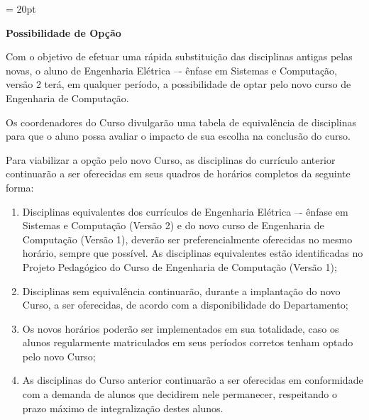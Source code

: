 \documentclass[12pt,a4paper]{article}
\begin{document}
\thispagestyle{firstpage} %
\headsep = 20pt
\setlength{\tabcolsep}{5pt} %
\vspace*{2.0cm}

\pagestyle{plain} %

\begin{center}
  \textbf{\LARGE Possibilidade de Opção}
\end{center}
\vspace*{0.5cm}

Com o objetivo de efetuar uma rápida substituição das disciplinas antigas pelas novas, o
aluno de Engenharia Elétrica –- ênfase em Sistemas e Computação, versão 2  terá, em qualquer período, a possibilidade de
optar pelo novo curso de Engenharia de Computação.

Os coordenadores do Curso divulgarão uma tabela de equivalência de disciplinas para que
o aluno possa avaliar o impacto de sua escolha na conclusão do curso.

Para viabilizar a opção pelo novo Curso, as disciplinas do currículo anterior continuarão a
ser oferecidas em seus quadros de horários completos da seguinte forma:

\begin{enumerate}
  \item Disciplinas equivalentes dos currículos de Engenharia Elétrica –- ênfase em Sistemas
        e Computação (Versão 2)  e do novo curso de Engenharia de Computação (Versão 1), deverão ser preferencialmente
        oferecidas no mesmo horário, sempre que possível. As disciplinas equivalentes estão
        identificadas no Projeto Pedagógico do Curso de Engenharia de Computação (Versão 1);
  \item Disciplinas sem equivalência continuarão, durante a implantação do novo Curso, a ser
        oferecidas, de acordo com a disponibilidade do Departamento;
  \item Os novos horários poderão ser implementados em sua totalidade, caso os alunos
        regularmente matriculados em seus períodos corretos tenham optado pelo novo Curso;
  \item As disciplinas do Curso anterior continuarão a ser oferecidas em conformidade com a
        demanda de alunos que decidirem nele permanecer, respeitando o prazo máximo de
        integralização destes alunos.
\end{enumerate}
\end{document}
